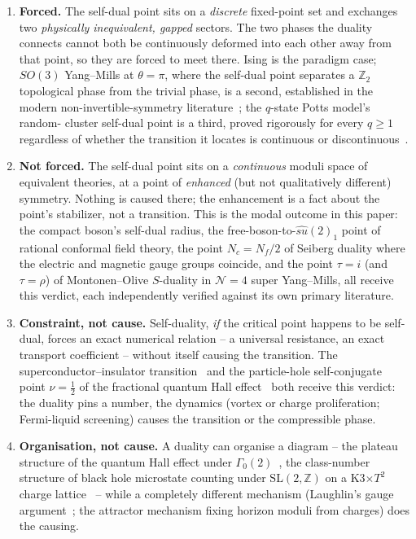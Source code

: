 \documentclass[11pt,a4paper]{article}
\begin{document}
\begin{enumerate}[leftmargin=*]
\item \textbf{Forced.} The self-dual point sits on a \emph{discrete} fixed-point set and exchanges two
  \emph{physically inequivalent, gapped} sectors. The two phases the duality connects cannot both be
  continuously deformed into each other away from that point, so they are forced to meet there. Ising
  is the paradigm case; $SO(3)$ Yang--Mills at $\theta=\pi$, where the self-dual point separates a
  $\mathbb Z_2$ topological phase from the trivial phase, is a second, established in the modern
  non-invertible-symmetry literature~\cite{KaidiOhmoriZheng2022}; the $q$-state Potts model's random-
  cluster self-dual point is a third, proved rigorously for every $q\geq1$ regardless of whether the
  transition it locates is continuous or discontinuous~\cite{BeffaraDuminilCopin2012}.
\item \textbf{Not forced.} The self-dual point sits on a \emph{continuous} moduli space of equivalent
  theories, at a point of \emph{enhanced} (but not qualitatively different) symmetry. Nothing is caused
  there; the enhancement is a fact about the point's stabilizer, not a transition. This is the modal
  outcome in this paper: the compact boson's self-dual radius, the free-boson-to-$\widehat{su}(2)_1$
  point of rational conformal field theory, the point $N_c=N_f/2$ of Seiberg duality where the electric
  and magnetic gauge groups coincide, and the point $\tau=i$ (and $\tau=\rho$) of Montonen--Olive
  $S$-duality in $\mathcal N=4$ super Yang--Mills, all receive this verdict, each independently
  verified against its own primary literature.
\item \textbf{Constraint, not cause.} Self-duality, \emph{if} the critical point happens to be
  self-dual, forces an exact numerical relation -- a universal resistance, an exact transport
  coefficient -- without itself causing the transition. The superconductor--insulator
  transition~\cite{Fisher1990} and the particle-hole self-conjugate point $\nu=\tfrac12$ of the
  fractional quantum Hall effect~\cite{Son2015} both receive this verdict: the duality pins a number,
  the dynamics (vortex or charge proliferation; Fermi-liquid screening) causes the transition or the
  compressible phase.
\item \textbf{Organisation, not cause.} A duality can organise a diagram -- the plateau structure of
  the quantum Hall effect under $\Gamma_0(2)$~\cite{LutkenRoss1992}, the class-number structure of
  black hole microstate counting under $\mathrm{SL}(2,\mathbb Z)$ on a K3$\times T^2$ charge
  lattice~\cite{Moore1998} -- while a completely different mechanism (Laughlin's gauge
  argument~\cite{Laughlin1981}; the attractor mechanism fixing horizon moduli from charges) does the
  causing.
\end{enumerate}
\end{document}
